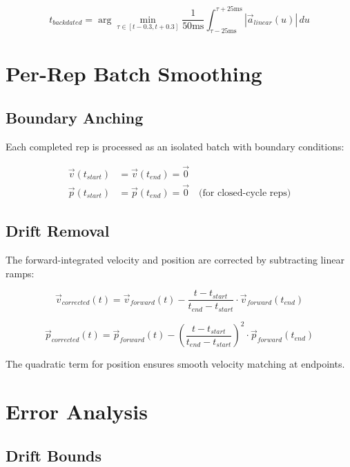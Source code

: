 \begin{equation}
    t_{backdated} = \arg\min_{\tau \in [t-0.3, t+0.3]} \frac{1}{50\text{ms}} \int_{\tau-25\text{ms}}^{\tau+25\text{ms}} |\vec{a}_{linear}(u)| \, du
\end{equation}

\section{Per-Rep Batch Smoothing}

\subsection{Boundary Anching}

Each completed rep is processed as an isolated batch with boundary conditions:

\begin{align}
    \vec{v}(t_{start}) &= \vec{v}(t_{end}) = \vec{0} \\
    \vec{p}(t_{start}) &= \vec{p}(t_{end}) = \vec{0} \quad \text{(for closed-cycle reps)}
\end{align}

\subsection{Drift Removal}

The forward-integrated velocity and position are corrected by subtracting linear ramps:

\begin{equation}
    \vec{v}_{corrected}(t) = \vec{v}_{forward}(t) - \frac{t - t_{start}}{t_{end} - t_{start}} \cdot \vec{v}_{forward}(t_{end})
\end{equation}

\begin{equation}
    \vec{p}_{corrected}(t) = \vec{p}_{forward}(t) - \left(\frac{t - t_{start}}{t_{end} - t_{start}}\right)^2 \cdot \vec{p}_{forward}(t_{end})
\end{equation}

The quadratic term for position ensures smooth velocity matching at endpoints.

\section{Error Analysis}

\subsection{Drift Bounds}

